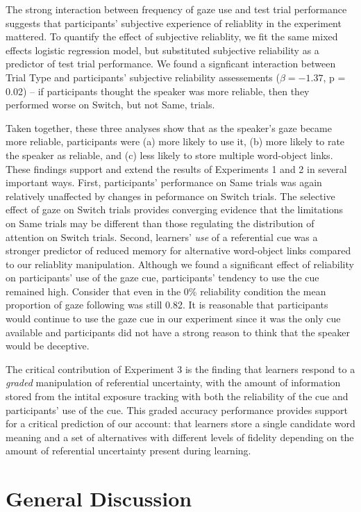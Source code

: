 \documentclass[a4paper,man,floatsintext]{apa6}
\begin{document}
The strong interaction between frequency of gaze use and test trial
performance suggests that participants' subjective experience of
reliablity in the experiment mattered. To quantify the effect of
subjective reliablity, we fit the same mixed effects logistic regression
model, but substituted subjective reliability as a predictor of test
trial performance. We found a signficant interaction between Trial Type
and participants' subjective reliability assessements
(\(\beta = -1.37\), p = 0.02) -- if participants thought the speaker was
more reliable, then they performed worse on Switch, but not Same,
trials.

Taken together, these three analyses show that as the speaker's gaze
became more reliable, participants were (a) more likely to use it, (b)
more likely to rate the speaker as reliable, and (c) less likely to
store multiple word-object links. These findings support and extend the
results of Experiments 1 and 2 in several important ways. First,
participants' performance on Same trials was again relatively unaffected
by changes in peformance on Switch trials. The selective effect of gaze
on Switch trials provides converging evidence that the limitations on
Same trials may be different than those regulating the distribution of
attention on Switch trials. Second, learners' \emph{use} of a
referential cue was a stronger predictor of reduced memory for
alternative word-object links compared to our reliablity manipulation.
Although we found a significant effect of reliability on participants'
use of the gaze cue, participants' tendency to use the cue remained
high. Consider that even in the 0\% reliability condition the mean
proportion of gaze following was still 0.82. It is reasonable that
participants would continue to use the gaze cue in our experiment since
it was the only cue available and participants did not have a strong
reason to think that the speaker would be deceptive.

The critical contribution of Experiment 3 is the finding that learners
respond to a \emph{graded} manipulation of referential uncertainty, with
the amount of information stored from the intital exposure tracking with
both the reliability of the cue and participants' use of the cue. This
graded accuracy performance provides support for a critical prediction
of our account: that learners store a single candidate word meaning and
a set of alternatives with different levels of fidelity depending on the
amount of referential uncertainty present during learning.

\section{General Discussion}\label{general-discussion}
\end{document}
